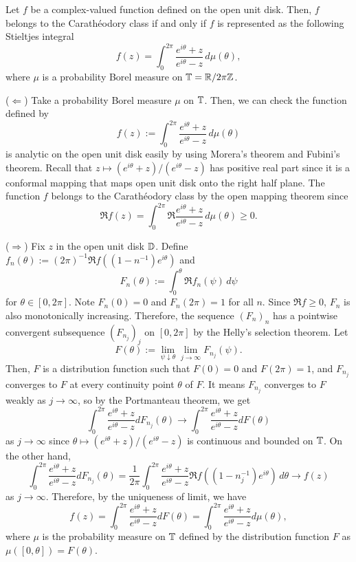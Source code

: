 \documentclass[a4paper]{article}
\begin{document}
\begin{thm}
Let $f$ be a complex-valued function defined on the open unit disk.
Then, $f$ belongs to the Carath\'eodory class if and only if $f$ is represented as the following Stieltjes integral
\[f(z)=\int_0^{2\pi}\frac{e^{i\theta}+z}{e^{i\theta}-z}\,d\mu(\theta),\]
where $\mu$ is a probability Borel measure on $\mathbb{T}=\mathbb{R}/2\pi\mathbb{Z}$.
\end{thm}
\begin{pf}
($\Leftarrow$)
Take a probability Borel measure $\mu$ on $\mathbb{T}$.
Then, we can check the function defined by
\[f(z):=\int_0^{2\pi}\frac{e^{i\theta}+z}{e^{i\theta}-z}\,d\mu(\theta)\]
is analytic on the open unit disk easily by using Morera's theorem and Fubini's theorem.
Recall that $z\mapsto(e^{i\theta}+z)/(e^{i\theta}-z)$ has positive real part since it is a conformal mapping that maps open unit disk onto the right half plane.
The function $f$ belongs to the Carath\'eodory class by the open mapping theorem since
\[\Re f(z)=\int_0^{2\pi}\Re\frac{e^{i\theta}+z}{e^{i\theta}-z}\,d\mu(\theta)\ge0.\]

($\Rightarrow$)
Fix $z$ in the open unit disk $\mathbb{D}$.
Define $f_n(\theta):=(2\pi)^{-1}\Re f((1-n^{-1})e^{i\theta})$ and
\[F_n(\theta):=\int_0^\theta\Re f_n(\psi)\,d\psi\]
for $\theta\in[0,2\pi]$.
Note $F_n(0)=0$ and $F_n(2\pi)=1$ for all $n$.
Since $\Re f\ge0$, $F_n$ is also monotonically increasing.
Therefore, the sequence $(F_n)_n$ has a pointwise convergent subsequence $(F_{n_j})_j$ on $[0,2\pi]$ by the Helly's selection theorem.
Let
\[F(\theta):=\lim_{\psi\downarrow\theta}\lim_{j\to\infty}F_{n_j}(\psi).\]
Then, $F$ is a distribution function such that $F(0)=0$ and $F(2\pi)=1$, and $F_{n_j}$ converges to $F$ at every continuity point $\theta$ of $F$.
It means $F_{n_j}$ converges to $F$ weakly as $j\to\infty$, so by the Portmanteau theorem, we get
\[\int_0^{2\pi}\frac{e^{i\theta}+z}{e^{i\theta}-z}dF_{n_j}(\theta)\to\int_0^{2\pi}\frac{e^{i\theta}+z}{e^{i\theta}-z}dF(\theta)\]
as $j\to\infty$ since $\theta\mapsto(e^{i\theta}+z)/(e^{i\theta}-z)$ is continuous and bounded on $\mathbb{T}$.
On the other hand,
\[\int_0^{2\pi}\frac{e^{i\theta}+z}{e^{i\theta}-z}dF_{n_j}(\theta)
=\frac1{2\pi}\int_0^{2\pi}\frac{e^{i\theta}+z}{e^{i\theta}-z}\Re f((1-n_j^{-1})e^{i\theta})\,d\theta\to f(z)\]
as $j\to\infty$.
Therefore, by the uniqueness of limit, we have
\[f(z)=\int_0^{2\pi}\frac{e^{i\theta}+z}{e^{i\theta}-z}dF(\theta)=\int_0^{2\pi}\frac{e^{i\theta}+z}{e^{i\theta}-z}d\mu(\theta),\]
where $\mu$ is the probability measure on $\mathbb{T}$ defined by the distribution function $F$ as $\mu([0,\theta])=F(\theta)$.
\end{pf}
\end{document}
